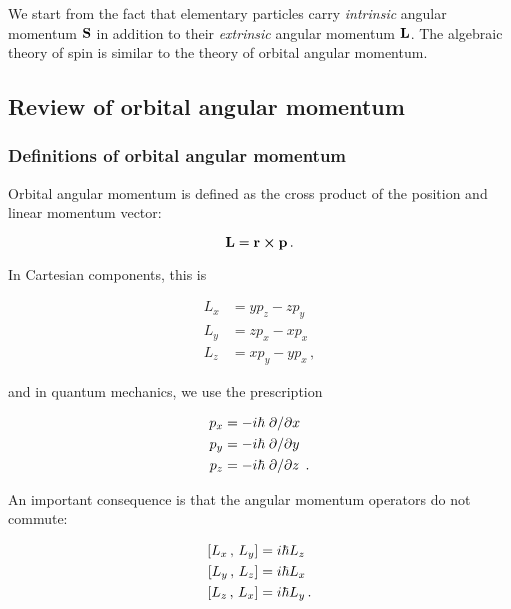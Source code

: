 \documentclass[12pt, titlepage]{article}
\newcommand{\com}[2]{\qty[#1 \,,\, #2]}
\begin{document}
We start from the fact that elementary particles carry \emph{intrinsic} angular momentum $\vb{S}$ in addition to their \emph{extrinsic} angular momentum $\vb{L}$. The algebraic theory of spin is similar to the theory of orbital angular momentum.

\subsection{Review of orbital angular momentum}
\subsubsection{Definitions of orbital angular momentum}
Orbital angular momentum is defined as the cross product of the position and linear momentum vector:

\begin{equation}
\vb{L} = \vb{r}\cross\vb{p} \, .
\end{equation}


In Cartesian components, this is

\begin{subequations}
	\begin{align}
	L_{x} &= y p_{z} - z p_{y} \\
	L_{y} &= z p_{x} - x p_{x} \\
	L_{z} &= x p_{y} - y p_{x} \, ,
	\end{align}
\end{subequations}

and in quantum mechanics, we use the prescription

\begin{subequations}
	\begin{align}
	p_{x} &= - i \hbar \pdv*{x} \\
	p_{y} &= - i \hbar \pdv*{y} \\
	p_{z} &= - i \hbar \pdv*{z} \, .
	\end{align}
\end{subequations}

An important consequence is that the angular momentum operators do not commute:

\begin{subequations}
	\begin{align}
	\com{L_{x}}{L_{y}} &= i \hbar L_{z} \\
	\com{L_{y}}{L_{z}} &= i \hbar L_{x} \\
	\com{L_{z}}{L_{x}} &= i \hbar L_{y} \, .
	\end{align}
\end{subequations}
\end{document}
